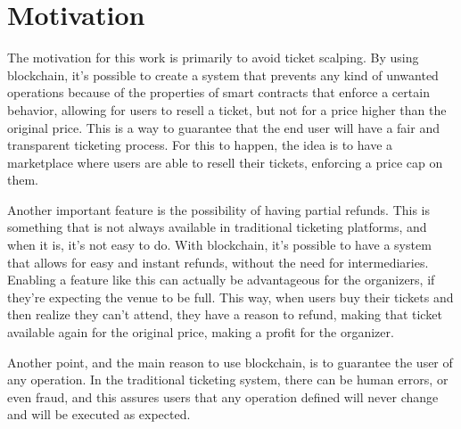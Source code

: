 \section{Motivation}
\label{sec:motivation}

The motivation for this work is primarily to avoid ticket scalping. By using
blockchain, it's possible to create a system that prevents any kind of unwanted
operations because of the properties of smart contracts that enforce a certain
behavior, allowing for users to resell a ticket, but not for a price higher
than the original price. This is a way to guarantee that the end user will have
a fair and transparent ticketing process. For this to happen, the idea is to
have a marketplace where users are able to resell their tickets, enforcing a
price cap on them.

Another important feature is the possibility of having partial refunds. This is
something that is not always available in traditional ticketing platforms, and
when it is, it's not easy to do. With blockchain, it's possible to have a
system that allows for easy and instant refunds, without the need for
intermediaries. Enabling a feature like this can actually be advantageous for
the organizers, if they're expecting the venue to be full. This way, when users
buy their tickets and then realize they can't attend, they have a reason to
refund, making that ticket available again for the original price, making a
profit for the organizer.

Another point, and the main reason to use blockchain, is to guarantee the user
of any operation. In the traditional ticketing system, there can be human
errors, or even fraud, and this assures users that any operation defined will
never change and will be executed as expected.